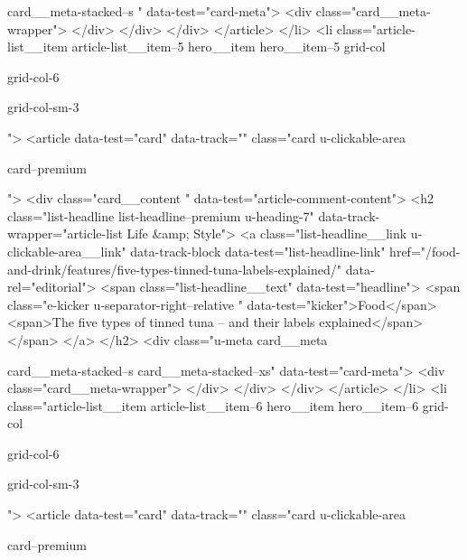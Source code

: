 {{{						card__meta-stacked--s
						" data-test="card-meta">
<div class="card__meta-wrapper">
</div>
</div>
</div>
</article>
</li>
<li class="article-list__item article-list__item--5 hero__item hero__item--5
			grid-col
			
			
			
			
			grid-col-6
			
			
			
			
			
			grid-col-sm-3
			
			
			
			
			
			
			
			
			">
<article data-test="card" data-track="" class="card
			u-clickable-area
			
			
			card--premium
			
			
			
			
			
			 ">
<div class="card__content " data-test="article-comment-content">
<h2 class="list-headline list-headline--premium u-heading-7" data-track-wrapper="article-list Life &amp; Style">
<a class="list-headline__link u-clickable-area__link" data-track-block data-test="list-headline-link" href="/food-and-drink/features/five-types-tinned-tuna-labels-explained/" data-rel="editorial">
<span class="list-headline__text" data-test="headline">
<span class="e-kicker u-separator-right--relative " data-test="kicker">Food</span>
<span>The five types of tinned tuna – and their labels explained</span>
</span>
</a>
</h2>
<div class="u-meta card__meta
						
						card__meta-stacked--s
						card__meta-stacked--xs" data-test="card-meta">
<div class="card__meta-wrapper">
</div>
</div>
</div>
</article>
</li>
<li class="article-list__item article-list__item--6 hero__item hero__item--6
			grid-col
			
			
			
			
			grid-col-6
			
			
			
			
			
			grid-col-sm-3
			
			
			
			
			
			
			
			
			">
<article data-test="card" data-track="" class="card
			u-clickable-area
			
			
			card--premium
			
			
			
			
			
}}}
